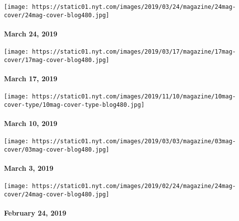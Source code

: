 \href{https://www.nytimes.com/issue/magazine/2019/03/22/the-032419-issue}{}

\texttt{[image: https://static01.nyt.com/images/2019/03/24/magazine/24mag-cover/24mag-cover-blog480.jpg]}

\hypertarget{march-24-2019}{%
\paragraph{March 24, 2019}\label{march-24-2019}}

\href{https://www.nytimes.com/issue/magazine/2019/03/15/the-31719-issue}{}

\texttt{[image: https://static01.nyt.com/images/2019/03/17/magazine/17mag-cover/17mag-cover-blog480.jpg]}

\hypertarget{march-17-2019}{%
\paragraph{March 17, 2019}\label{march-17-2019}}

\href{https://www.nytimes.com/interactive/2019/03/07/magazine/top-songs.html}{}

\texttt{[image: https://static01.nyt.com/images/2019/11/10/magazine/10mag-cover-type/10mag-cover-type-blog480.jpg]}

\hypertarget{march-10-2019}{%
\paragraph{March 10, 2019}\label{march-10-2019}}

\href{https://www.nytimes.com/issue/magazine/2019/03/01/the-322019-issue}{}

\texttt{[image: https://static01.nyt.com/images/2019/03/03/magazine/03mag-cover/03mag-cover-blog480.jpg]}

\hypertarget{march-3-2019}{%
\paragraph{March 3, 2019}\label{march-3-2019}}

\href{https://www.nytimes.com/issue/magazine/2019/02/22/the-24219-issue}{}

\texttt{[image: https://static01.nyt.com/images/2019/02/24/magazine/24mag-cover/24mag-cover-blog480.jpg]}

\hypertarget{february-24-2019}{%
\paragraph{February 24, 2019}\label{february-24-2019}}


